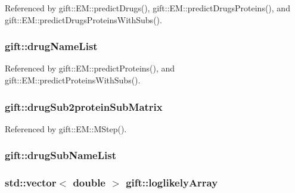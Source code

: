 Referenced by gift\+::\+E\+M\+::predict\+Drugs(), gift\+::\+E\+M\+::predict\+Drugs\+Proteins(), and gift\+::\+E\+M\+::predict\+Drugs\+Proteins\+With\+Subs().

\subsubsection[{\texorpdfstring{drug\+Name\+List}{drugNameList}}]{ gift\+::drug\+Name\+List}\hypertarget{namespacegift_a8ace6c6707676ba4866203d5ddc0a02e}{}\label{namespacegift_a8ace6c6707676ba4866203d5ddc0a02e}


Referenced by gift\+::\+E\+M\+::predict\+Proteins(), and gift\+::\+E\+M\+::predict\+Proteins\+With\+Subs().

\subsubsection[{\texorpdfstring{drug\+Sub2protein\+Sub\+Matrix}{drugSub2proteinSubMatrix}}]{ gift\+::drug\+Sub2protein\+Sub\+Matrix}\hypertarget{namespacegift_ae49d782c144d39543cd6504f5e7d9c7a}{}\label{namespacegift_ae49d782c144d39543cd6504f5e7d9c7a}


Referenced by gift\+::\+E\+M\+::\+M\+Step().

\subsubsection[{\texorpdfstring{drug\+Sub\+Name\+List}{drugSubNameList}}]{ gift\+::drug\+Sub\+Name\+List}\hypertarget{namespacegift_afacd45b62c4abab4c029c7b0e82a149c}{}\label{namespacegift_afacd45b62c4abab4c029c7b0e82a149c}
\subsubsection[{\texorpdfstring{loglikely\+Array}{loglikelyArray}}]{\setlength{\rightskip}{0pt plus 5cm}std\+::vector$<$ double $>$ gift\+::loglikely\+Array}\hypertarget{namespacegift_ac31667d9b67b35a70ac9d46dfe6a7967}{}\label{namespacegift_ac31667d9b67b35a70ac9d46dfe6a7967}


